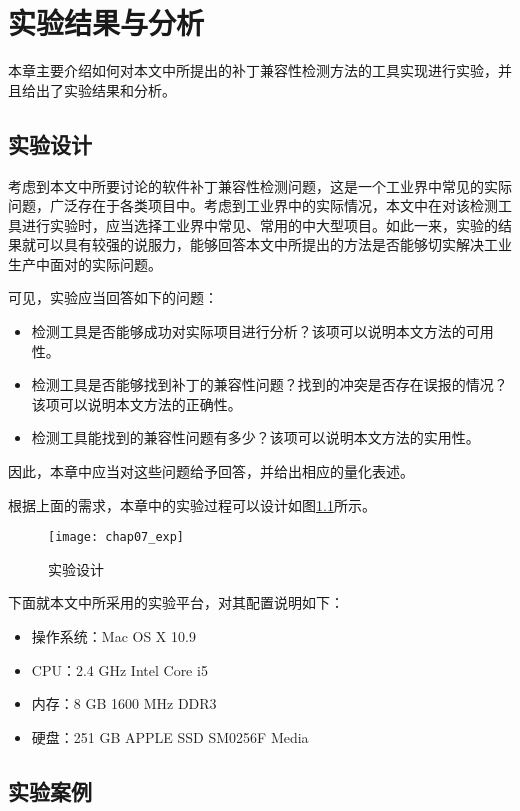 \chapter{实验结果与分析}
\label {exp}
本章主要介绍如何对本文中所提出的补丁兼容性检测方法的工具实现进行实验，并且给出了实验结果和分析。

\section{实验设计}
\label {exp_des}

考虑到本文中所要讨论的软件补丁兼容性检测问题，这是一个工业界中常见的实际问题，广泛存在于各类项目中。考虑到工业界中的实际情况，本文中在对该检测工具进行实验时，应当选择工业界中常见、常用的中大型项目。如此一来，实验的结果就可以具有较强的说服力，能够回答本文中所提出的方法是否能够切实解决工业生产中面对的实际问题。

可见，实验应当回答如下的问题：
\begin{itemize}
	\item 检测工具是否能够成功对实际项目进行分析？该项可以说明本文方法的可用性。
	\item 检测工具是否能够找到补丁的兼容性问题？找到的冲突是否存在误报的情况？该项可以说明本文方法的正确性。
	\item 检测工具能找到的兼容性问题有多少？该项可以说明本文方法的实用性。
\end{itemize}

因此，本章中应当对这些问题给予回答，并给出相应的量化表述。

根据上面的需求，本章中的实验过程可以设计如图\ref {des_exp}所示。

\begin{figure}[H]
	\centering
	\texttt{[image: chap07\_exp]}
	\caption {实验设计}
	\label {des_exp}	
\end{figure}


下面就本文中所采用的实验平台，对其配置说明如下：
\begin{itemize}
	\item 操作系统：Mac OS X 10.9
	\item CPU：2.4 GHz Intel Core i5
	\item 内存：8 GB 1600 MHz DDR3
	\item 硬盘：251 GB APPLE SSD SM0256F Media
\end{itemize}

\section{实验案例}
\label {exp_data}


